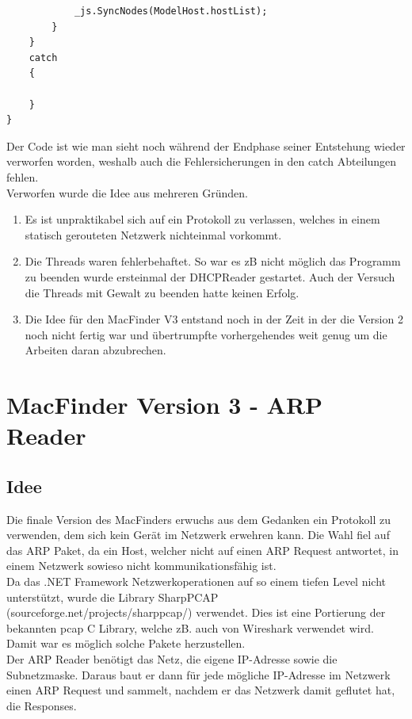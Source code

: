 \documentclass[12pt,a4paper]{report}
\begin{document}
\begin{onehalfspace}
\begin{lstlisting}
            _js.SyncNodes(ModelHost.hostList);
        }
    }
    catch
    {
                
    }
}
\end{lstlisting}

Der Code ist wie man sieht noch während der Endphase seiner Entstehung wieder verworfen worden, weshalb auch die Fehlersicherungen in den catch Abteilungen fehlen.\\

Verworfen wurde die Idee aus mehreren Gründen. 
\begin{enumerate}
\item Es ist unpraktikabel sich auf ein Protokoll zu verlassen, welches in einem statisch gerouteten Netzwerk nichteinmal vorkommt. 
\item Die Threads waren fehlerbehaftet. So war es zB nicht möglich das Programm zu beenden wurde ersteinmal der DHCPReader gestartet. Auch der Versuch die Threads mit Gewalt zu beenden hatte keinen Erfolg.
\item Die Idee für den MacFinder V3 entstand noch in der Zeit in der die Version 2 noch nicht fertig war und übertrumpfte vorhergehendes weit genug um die Arbeiten daran abzubrechen. 
\end{enumerate}

\section{MacFinder Version 3 - ARP Reader}
\subsection{Idee}
Die finale Version des MacFinders erwuchs aus dem Gedanken ein Protokoll zu verwenden, dem sich kein Gerät im Netzwerk erwehren kann. Die Wahl fiel auf das ARP Paket, da ein Host, welcher nicht auf einen ARP Request antwortet, in einem Netzwerk sowieso nicht kommunikationsfähig ist.\\
Da das .NET Framework Netzwerkoperationen auf so einem tiefen Level nicht unterstützt, wurde die Library SharpPCAP (sourceforge.net/projects/sharppcap/) verwendet. Dies ist eine Portierung der bekannten pcap C Library, welche zB. auch von Wireshark verwendet wird. Damit war es möglich solche Pakete herzustellen.\\
Der ARP Reader benötigt das Netz, die eigene IP-Adresse sowie die Subnetzmaske. Daraus baut er dann für jede mögliche IP-Adresse im Netzwerk einen ARP Request und sammelt, nachdem er das Netzwerk damit geflutet hat, die Responses.\\

\end{onehalfspace}
\end{document}
